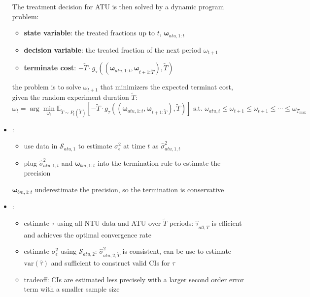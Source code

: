 \documentclass[twoside]{article}
\begin{document}
\begin{itemize}
    The treatment decision for ATU is then solved by a dynamic program problem:
    \begin{itemize}
        \item \textbf{state variable}: the treated fractions up to $t$, $\boldsymbol{\omega}_{atu,1:t}$
        \item \textbf{decision variable}: the treated fraction of the next period $\omega_{t+1}$
        \item \textbf{terminate cost}: $-\tilde{T}\cdot g_{\tau}\left(\left(\boldsymbol{\omega}_{atu,1:t},\boldsymbol{\omega}_{t+1:\tilde{T}}\right),\tilde{T}\right)$
    \end{itemize}
    the problem is to solve $\omega_{t+1}$ that minimizers the expected terminat cost, given the random experiment duration $\tilde{T}$:$$ \omega_t = \arg\min_{\omega_t} \mathbb{E}_{\tilde{T}\sim P_t\left(\tilde{T}\right)} \left[-\tilde{T}\cdot g_{\tau}\left(\left( \boldsymbol{\omega}_{atu,1:t},\boldsymbol{\omega}_{t+1:\tilde{T}} \right),\tilde{T}\right)\right] \text{ s.t. } \omega_{atu,t}\leq \omega_{t+1}\leq \omega_{t+1}\leq \cdots\leq \omega_{T_{\max}}$$
    \item {}: 
    \begin{itemize}
        \item use data in $\mathcal{S}_{atu,1}$ to estimate $\sigma^2_{\epsilon}$ at time $t$ as $\hat{\sigma}^2_{atu,1,t}$
        \item plug $\hat{\sigma}^2_{atu,1,t}$ and $\boldsymbol{\omega}_{bm,1:t}$ into the termination rule to estimate the precision
    \end{itemize}
    $\boldsymbol{\omega}_{bm,1:t}$ underestimate the precision, so the termination is conservative
    \item {}: 
    \begin{itemize}
        \item estimate $\tau$ using all NTU data and ATU over $\tilde{T}$ periods: $\hat{\tau}_{all,\tilde{T}}$ is efficient and achieves the optimal convergence rate
        \item estimate $\sigma^2_{\epsilon}$ using $\mathcal{S}_{atu,2}$: $\hat{\sigma}^2_{atu,2,\tilde{T}}$ is consistent, can be use to estimate $\mathrm{var}(\hat{\tau})$ and sufficient to construct valid CIs for $\tau$
        \item tradeoff: CIs are estimated less precisely with a larger second order error term with a smaller sample size
    \end{itemize}
\end{itemize}
\end{document}
